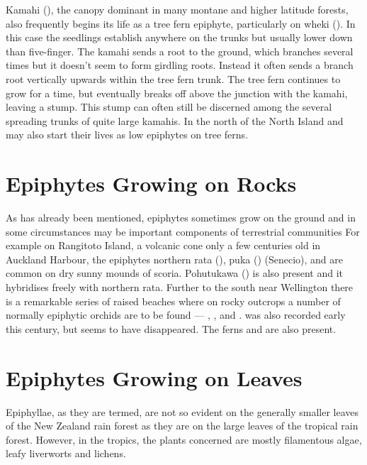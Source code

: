 Kamahi (), the canopy dominant in many montane and higher latitude forests, also frequently begins its life as a tree fern epiphyte, particularly on wheki ().
In this case the seedlings establish anywhere on the trunks but usually lower down than five-finger.
The kamahi sends a root to the ground, which branches several times but it doesn't seem to form girdling roots.
Instead it often sends a branch root vertically upwards within the tree fern trunk.
The tree fern continues to grow for a time, but eventually breaks off above the junction with the kamahi, leaving a stump.
This stump can often still be discerned among the several spreading trunks of quite large kamahis.
In the north of the North Island  and  may also start their lives as low epiphytes on tree ferns.

\section{Epiphytes Growing on Rocks}

As has already been mentioned, epiphytes sometimes grow on the ground and in some circumstances may be important components of terrestrial communities For example on Rangitoto Island, a volcanic cone only a few centuries old in Auckland Harbour, the epiphytes northern rata (), puka () (Senecio),   and  are common on dry sunny mounds of scoria.
Pohutukawa () is also present and it hybridises freely with northern rata.
Further to the south near Wellington there is a remarkable series of raised beaches where on rocky outcrops a number of normally epiphytic orchids are to be found — , , and .  was also recorded early this century, but seems to have disappeared.
The ferns  and  are also present.

\section{Epiphytes Growing on Leaves}

Epiphyllae, as they are termed, are not so evident on the generally smaller leaves of the New Zealand rain forest as they are on the large leaves of the tropical rain forest.
However, in the tropics, the plants concerned are mostly filamentous algae, leafy liverworts and lichens.

